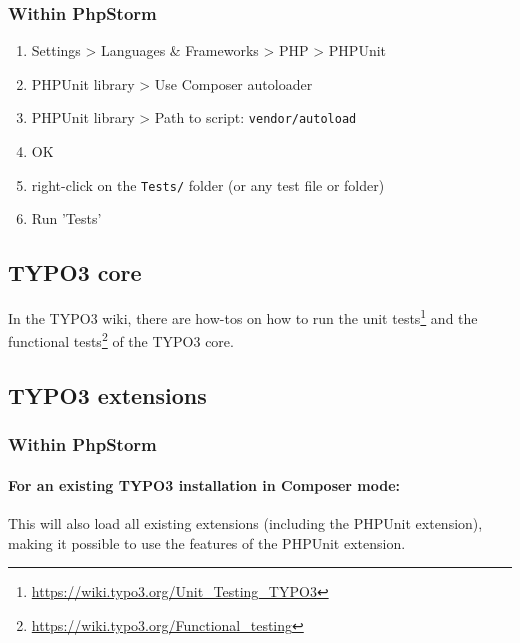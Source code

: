 \documentclass[a4paper,10pt,headsepline]{scrartcl}
\begin{document}
\subsubsection{Within PhpStorm}
\begin{enumerate}
  \item Settings > Languages \& Frameworks > PHP > PHPUnit
  \item PHPUnit library > Use Composer autoloader
  \item PHPUnit library > Path to script: \texttt{vendor/autoload}
  \item OK
  \item right-click on the \texttt{Tests/} folder (or any test file or folder)
  \item Run 'Tests'
\end{enumerate}


\subsection{TYPO3 core}

In the TYPO3 wiki, there are how-tos on how to run the unit tests\footnote{\url{https://wiki.typo3.org/Unit_Testing_TYPO3}} and the functional tests\footnote{\url{https://wiki.typo3.org/Functional_testing}} of the TYPO3 core.


\subsection{TYPO3 extensions}

\subsubsection{Within PhpStorm}

\paragraph{For an existing TYPO3 installation in Composer mode:}

This will also load all existing extensions (including the PHPUnit extension), making it possible to use the features of the PHPUnit extension.
\end{document}
